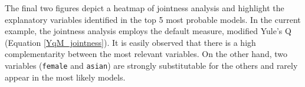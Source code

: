 The final two figures depict a heatmap of jointness analysis
and highlight the explanatory variables identified in the
top 5 most probable models. In the current example, the
jointness analysis employs the default measure, modified
Yule's Q (Equation \ref{YqM_jointness}). It is easily observed
that there is a high complementarity between the most relevant
variables. On the other hand, two variables (\texttt{female}
and \texttt{asian}) are strongly substitutable for the others
and rarely appear in the most likely models.

